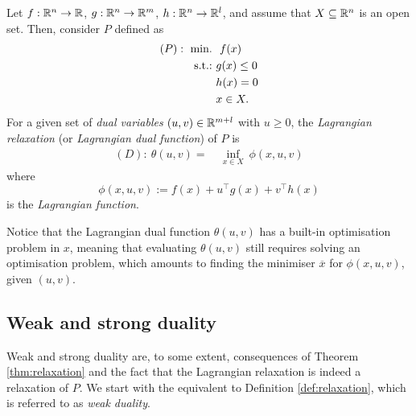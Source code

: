 Let $f: \mathbb{R}^n \rightarrow \mathbb{R}$, $g: \mathbb{R}^n \rightarrow \mathbb{R}^m$, $h: \mathbb{R}^n \rightarrow \mathbb{R}^l$, and assume that $X \subseteq \mathbb{R}^n$ is an open set. Then, consider $P$ defined as
%
\begin{align*}
	(P) :~ \mathop{\text{min.~}} & \ f(x) \\
	\mathop{\text{s.t.:~}} & g(x) \leq 0 \\
	& h(x) = 0  \\
	& x \in X.
\end{align*}
%
For a given set of \emph{dual variables} $(u,v) \in \mathbb{R}^{m+l}$ with $u \geq 0$, the \emph{Lagrangian relaxation} (or \emph{Lagrangian dual function}) of $P$ is
%
\begin{align*}
	(D) :~ \theta(u,v) = \ &\inf_{x \in X} \ \phi(x,u,v)
\end{align*}
%
where
$$ 
\phi(x,u,v) := f(x)  + u^\top g(x) + v^\top h(x) 
$$
is the \emph{Lagrangian function}.

Notice that the Lagrangian dual function $\theta(u,v)$ has a built-in optimisation problem in $x$, meaning that evaluating $\theta(u,v)$ still requires solving an optimisation problem, which amounts to finding the minimiser $\overline{x}$ for $\phi(x,u,v)$, given $(u,v)$.

 
\subsection{Weak and strong duality}


Weak and strong duality are, to some extent, consequences of Theorem \ref{thm:relaxation} and the fact that the Lagrangian relaxation is indeed a relaxation of $P$. We start with the equivalent to Definition \ref{def:relaxation}, which is referred to as \emph{weak duality}.

